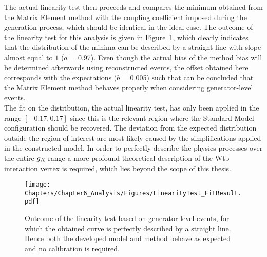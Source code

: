 The actual linearity test then proceeds and compares the minimum obtained from the Matrix Element method with the coupling coefficient imposed during the generation process, which should be identical in the ideal case.
The outcome of the linearity test for this analysis is given in Figure~\ref{fig::CalibCurve}, which clearly indicates that the distribution of the minima can be described by a straight line with slope almost equal to $1$ ($a$ = 0.97). Even though the actual bias of the method bias will be determined afterwards using reconstructed events, the offset obtained here corresponds with the expectations ($b$ = 0.005) such that can be concluded that the Matrix Element method behaves properly when considering generator-level events.
\\
The fit on the distribution, the actual linearity test, has only been applied in the range $\left[-0.17, 0.17\right]$ since this is the relevant region where the Standard Model configuration should be recovered. 
The deviation from the expected distribution outside the region of interest are most likely caused by the simplifications applied in the constructed model. In order to perfectly describe the physics processes over the entire $g_{R}$ range a more profound theoretical description of the Wtb interaction vertex is required, which lies beyond the scope of this thesis.
\begin{figure}[h!t]
 \centering
 \texttt{[image: Chapters/Chapter6\_Analysis/Figures/LinearityTest\_FitResult.pdf]}
 \caption{Outcome of the linearity test based on generator-level events, for which the obtained curve is perfectly described by a straight line. Hence both the developed model and method behave as expected and no calibration is required.} \label{fig::CalibCurve}
\end{figure}

